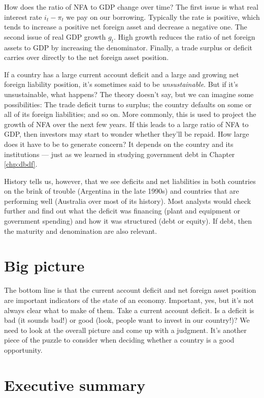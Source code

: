 How does the ratio of NFA to GDP change over time?
The first issue is what real interest rate $i_t-\pi_t$
we pay on our borrowing.
Typically the rate is positive, which tends to increase a positive
net foreign asset and decrease a negative one.
The second issue of real GDP growth $g_t$.
High growth reduces the ratio of net foreign assets to GDP by increasing
the denominator.
Finally, a trade surplus or deficit carries over directly to the net foreign asset position.

If a country has a large current account deficit and
a large and growing net foreign liability position,
it's sometimes said to be {\it unsustainable\/}.
But if it's unsustainable, what happens?
The theory doesn't say, but we can imagine some possibilities:
The trade deficit turns to surplus; the country defaults on
some or all of its foreign liabilities; and so on.
More commonly, this is used to project the growth
of NFA over the next few years.
If this leads to a large ratio of NFA to GDP, then
investors may start to wonder whether they'll be repaid.
How large does it have to be to generate concern?
It depends on the country and its institutions
--- just as we learned in studying government debt in Chapter \ref{chp:dbdf}.

History tells us, however, that we see deficits and net liabilities in both
countries on the brink of trouble (Argentina in the late 1990s)
and countries that are performing well (Australia over most of its history).
Most analysts would check further and find out what the deficit
was financing (plant and equipment or government spending)
and how it was structured (debt or equity).
If debt, then the maturity and denomination are also relevant.


\section{Big picture}

The bottom line is that the current account deficit
and net foreign asset position are important indicators
of the state of an economy.
Important, yes, but it's not always clear what to make of them.
Take a current account deficit.
Is a deficit is bad (it sounds bad!)
or good (look, people want to invest in our country!)?
We need to look at the overall picture and come up with a judgment.
It's another piece of the puzzle to consider when deciding
whether a country is a good opportunity.


\section*{Executive summary}


